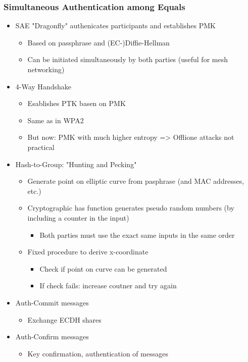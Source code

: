 \subsubsection{Simultaneous Authentication among Equals}
\begin{itemize}
  \item SAE "Dragonfly" authenicates participants and establishes PMK
    \begin{itemize}
      \item Based on passphrase and (EC-)Diffie-Hellman
      \item Can be initiated simultaneously by both parties (useful for mesh networking) 
    \end{itemize}
  \item 4-Way Handshake 
    \begin{itemize}
      \item Esablishes PTK basen on PMK
      \item Same as in WPA2 
      \item But now: PMK with much higher entropy => Offlione attacks not practical 
    \end{itemize}
  \item Hash-to-Group: "Hunting and Pecking" 
    \begin{itemize}
      \item Generate point on elliptic curve from pasphrase (and MAC addresses, etc.)
      \item Cryptographic has function generates pseudo random numbers (by including a counter in the input) 
        \begin{itemize}
          \item Both parties must use the exact same inputs in the same order
        \end{itemize}
      \item Fixed procedure to derive x-coordinate 
        \begin{itemize}
          \item Check if point on curve can be generated
          \item If check fails: increase coutner and try again 
        \end{itemize}
    \end{itemize}
  \item Auth-Commit messages
    \begin{itemize}
      \item Exchange ECDH shares
    \end{itemize}
  \item Auth-Confirm messages 
    \begin{itemize}
      \item Key confirmation, authentication of messages
    \end{itemize}
\end{itemize}

